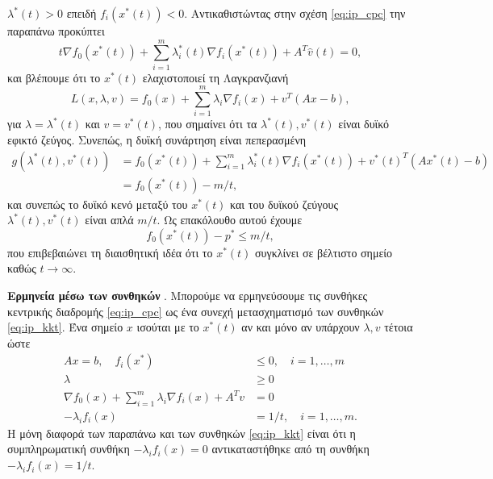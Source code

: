 \(\lambda^*(t) > 0 \) επειδή \(f_i(x^*(t)) < 0\). Αντικαθιστώντας στην
σχέση \eqref{eq:ip_cpc} την παραπάνω προκύπτει
\begin{equation*}
    t\nabla f_0 (x^*(t)) + \sum_{i = 1}^m \lambda_i^*(t) \nabla f_i
    (x^*(t)) + A^T \hat{v}(t) = 0,
\end{equation*}
και βλέπουμε ότι το \( x^*(t) \) ελαχιστοποιεί τη Λαγκρανζιανή
\begin{equation*}
    L(x, \lambda, v) = f_0(x) + \sum_{i = 1}^m \lambda_i \nabla f_i
    (x) + v^T(Ax - b),
\end{equation*}
για \( \lambda = \lambda^*(t) \) και \( v = v^*(t) \), που σημαίνει ότι τα
\( \lambda^*(t), v^*(t) \) είναι δυϊκό εφικτό ζεύγος. Συνεπώς, η δυϊκή συνάρτηση
είναι πεπερασμένη
\begin{align*}
    g(\lambda^*(t), v^*(t)) &=  f_0(x^*(t)) + \sum_{i = 1}^m \lambda_i^*(t) \nabla f_i
    (x^*(t)) + v^*(t)^T(Ax^*(t) - b) \\
    &= f_0(x^*(t)) - m/t,
\end{align*}
και συνεπώς το δυϊκό κενό μεταξύ του \( x^*(t) \) και του δυϊκού ζεύγους
\( \lambda^*(t), v^*(t) \) είναι απλά \( m/t \). Ως επακόλουθο αυτού έχουμε
\begin{equation*}
    f_0(x^*(t)) - p^* \leq m/t,
\end{equation*}
που επιβεβαιώνει τη διαισθητική ιδέα ότι το \( x^*(t) \) συγκλίνει σε βέλτιστο
σημείο καθώς \( t \to \infty \).

\textbf{Ερμηνεία μέσω των συνθηκών }. Μπορούμε να ερμηνεύσουμε τις
συνθήκες κεντρικής διαδρομής \eqref{eq:ip_cpc} ως ένα συνεχή μετασχηματισμό των
συνθηκών  \eqref{eq:ip_kkt}. Ένα σημείο \( x \) ισούται με το \( x^*(t)
\) αν και μόνο αν υπάρχουν  \( \lambda, v \) τέτοια ώστε
\begin{equation*}
    \begin{split}
        Ax = b, \quad f_i(x^*) &\leq 0,\quad i = 1, \dots, m\\
        \lambda &\geq 0\\
        \nabla f_0(x) + \sum_{i=1}^m \lambda_i \nabla f_i(x) + A^Tv & = 0 \\
        -\lambda_if_i(x) & = 1/t,\quad i = 1, \dots, m.
    \end{split}
\end{equation*}
Η μόνη διαφορά των παραπάνω και των συνθηκών \eqref{eq:ip_kkt} είναι ότι η
συμπληρωματική συνθήκη \( - \lambda_i f_i(x) = 0 \) αντικαταστήθηκε από τη
συνθήκη \( - \lambda_i f_i(x) = 1/t \).

